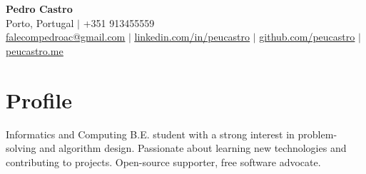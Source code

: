 






\begin{center}
  \textbf{\Huge Pedro Castro} \\ \vspace{6pt}
  \faMapMarker*{} \small{Porto, Portugal} \hspace{0.5pt} $|$ \hspace{0.5pt} \faPhone{} +351
  913455559 \\ \vspace{2pt}
  \faEnvelope{}
  \href{mailto:falecompedroac@gmail.com}{\underline{falecompedroac@gmail.com}}
  \hspace{0.5pt} $|$ \hspace{0.5pt}
  \faLinkedin{}
  \href{https://linkedin.com/in/peucastro}{\underline{linkedin.com/in/peucastro}}
  \hspace{0.5pt} $|$ \hspace{0.5pt}
  \faGithub{}
  \href{https://github.com/peucastro}{\underline{github.com/peucastro}} \hspace{0.5pt} $|$ \hspace{0.5pt}
  \faGlobe{}
  \href{https://peucastro.me}{\underline{peucastro.me}}
\end{center}

\section{Profile}
\begin{itemize}[leftmargin=0.15in, label={}]
    \small{
    \item{
        Informatics and Computing B.E. student with a strong
        interest in problem-solving and algorithm design.
        Passionate about learning new technologies and contributing
        to projects. Open-source supporter, free software advocate.
    }}
\end{itemize}

